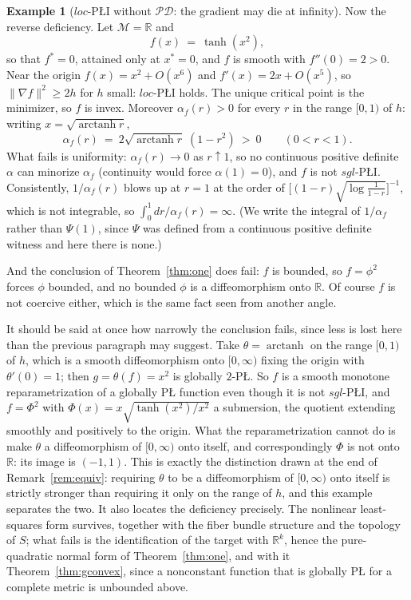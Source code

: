 \documentclass[11pt]{article}
\theoremstyle{plain}
\theoremstyle{definition}
\newtheorem{ex}[thm]{Example}
\theoremstyle{remark}
\newcommand{\M}{\mathcal{M}}
\newcommand{\R}{\mathbb{R}}
\begin{document}
\begin{ex}[$loc$-P\L{}I without $\mathcal{PD}$: the gradient may die at infinity]
\label{ex:tanh}
Now the reverse deficiency. Let $\M=\R$ and
\[
  f(x) \ =\ \tanh(x^2) ,
\]
so that $f^*=0$, attained only at $x^*=0$, and $f$ is smooth with
$f''(0)=2>0$. Near the origin $f(x) = x^2 + O(x^6)$ and $f'(x)=2x+O(x^5)$, so
$\|\nabla f\|^2 \ge 2h$ for $h$ small: $loc$-P\L{}I holds. The unique critical
point is the minimizer, so $f$ is invex.
Moreover $\alpha_f(r)>0$ for every $r$ in the range $[0,1)$ of $h$: writing
$x=\sqrt{\operatorname{arctanh} r}$,
\[
  \alpha_f(r) \ =\ 2\sqrt{\operatorname{arctanh} r}\;(1-r^2) \ >\ 0
  \qquad (0<r<1) .
\]
What fails is uniformity: $\alpha_f(r)\to0$ as $r\uparrow 1$, so no continuous
positive definite $\alpha$ can minorize $\alpha_f$ (continuity would force
$\alpha(1)=0$), and $f$ is not $sgl$-P\L{}I. Consistently, $1/\alpha_f(r)$ blows
up at $r=1$ at the order of $\bigl[(1-r)\sqrt{\log\tfrac{1}{1-r}}\bigr]^{-1}$,
which is not integrable, so $\int_0^1 dr/\alpha_f(r) = \infty$. (We write the
integral of $1/\alpha_f$ rather than $\Psi(1)$, since $\Psi$ was defined from a
continuous positive definite witness and here there is none.)

And the conclusion of Theorem~\ref{thm:one} does fail: $f$ is bounded, so
$f=\phi^2$ forces $\phi$ bounded, and no bounded $\phi$ is a diffeomorphism onto
$\R$. Of course $f$ is not coercive either, which is the same fact seen from
another angle.

It should be said at once how narrowly the conclusion fails, since less is lost here
than the previous paragraph may suggest. Take $\theta=\operatorname{arctanh}$ on the
range $[0,1)$ of $h$, which is a smooth diffeomorphism onto $[0,\infty)$ fixing the
origin with $\theta'(0)=1$; then $g=\theta(f)=x^2$ is globally $2$-P\L{}. So $f$ is a
smooth monotone reparametrization of a globally P\L{} function even though it is not
$sgl$-P\L{}I, and $f=\Phi^2$ with
$\Phi(x)=x\sqrt{\tanh(x^2)/x^2}$ a submersion, the quotient extending smoothly and
positively to the origin. What the reparametrization cannot do is make $\theta$ a
diffeomorphism of $[0,\infty)$ onto itself, and correspondingly $\Phi$ is not onto
$\R$: its image is $(-1,1)$. This is exactly the distinction drawn at the end of
Remark~\ref{rem:equiv}: requiring $\theta$ to be a diffeomorphism of $[0,\infty)$
onto itself is strictly stronger than requiring it only on the range of $h$, and this
example separates the two. It also locates the deficiency precisely. The nonlinear
least-squares form survives, together with the
fiber bundle structure and the topology of $S$; what fails is the identification of
the target with $\R^k$, hence the pure-quadratic normal form of
Theorem~\ref{thm:one}, and with it Theorem~\ref{thm:gconvex}, since a nonconstant
function that is globally P\L{} for a complete metric is unbounded above.


\end{ex}
\end{document}
